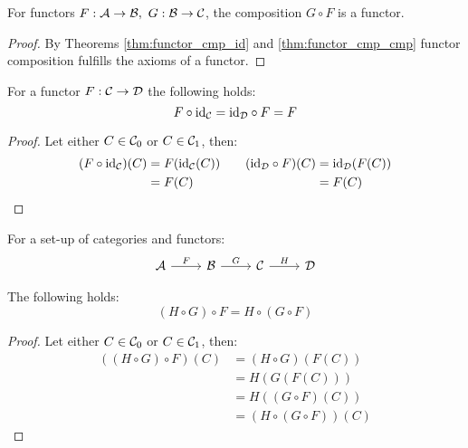 \begin{theorem}
  For functors $F: \mathcal{A} \to \mathcal{B},\ G: \mathcal{B}\to \mathcal{C}$, the composition $G\circ F$ is a functor.

  \begin{proof}
    By Theorems \ref{thm:functor_cmp_id} and \ref{thm:functor_cmp_cmp} functor
    composition fulfills the axioms of a functor.
  \end{proof}
\end{theorem}

\begin{theorem}
  For a functor $F:\mathcal{C}\to \mathcal{D}$ the following holds:
  \[F \circ \mathrm{id}_{\mathcal{C}} = \mathrm{id}_{\mathcal{D}} \circ F = F\]

  \begin{proof}
    Let either $C\in \mathcal{C}_0$ or $C\in \mathcal{C}_1$, then:
    \[
      \begin{aligned}
        (F \circ \mathrm{id}_{\mathcal{C}})(C)
          &= F(\mathrm{id}_{\mathcal{C}}(C))\\
          &= F (C)
      \end{aligned}
      \qquad
      \begin{aligned}
        (\mathrm{id}_{\mathcal{D}} \circ F)(C)
          &= \mathrm{id}_{\mathcal{D}} (F (C))\\
          &= F (C)
      \end{aligned}
    \]
  \end{proof}
  \vspace{-\baselineskip}
\end{theorem}

\begin{theorem}
  For a set-up of categories and functors:
  \[\begin{tikzcd}[ampersand replacement=\&]
    \A \& \B \& \C \& \D
    \arrow["F", from=1-1, to=1-2]
    \arrow["G", from=1-2, to=1-3]
    \arrow["H", from=1-3, to=1-4]
  \end{tikzcd}\]

  The following holds:
  \[(H \circ G) \circ F = H\circ(G\circ F)\]

  \begin{proof}
    Let either $C\in \mathcal{C}_0$ or $C\in \mathcal{C}_1$, then:
    \[
      \begin{aligned}
        ((H \circ G) \circ F) (C)
          &= (H\circ G) (F (C))\\
          &= H(G(F(C)))\\
          &= H((G\circ F)(C))\\
          &= (H\circ(G\circ F)) (C)
      \end{aligned}
    \]
  \end{proof}
  \vspace{-\baselineskip}
\end{theorem}

